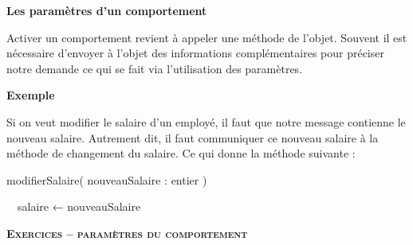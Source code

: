 \bigskip

{\sffamily\bfseries\upshape
Les paramètres d'un comportement}

{
Activer un comportement revient à appeler une méthode de
l'objet. Souvent il est nécessaire
d'envoyer à l'objet des informations
complémentaires pour préciser notre demande ce qui se fait via
l'utilisation des paramètres.}

{\bfseries
Exemple}

{
Si on veut modifier le salaire d'un employé, il faut
que notre message contienne le nouveau salaire. Autrement dit, il faut
communiquer ce nouveau salaire à la méthode de changement du salaire.
Ce qui donne la méthode suivante :}

{\sffamily
{} modifierSalaire( nouveauSalaire : entier )}

{\sffamily
\ \ salaire ← nouveauSalaire}

{\sffamily
{}}


\bigskip

{\sffamily\bfseries\scshape
Exercices – paramètres du comportement}

